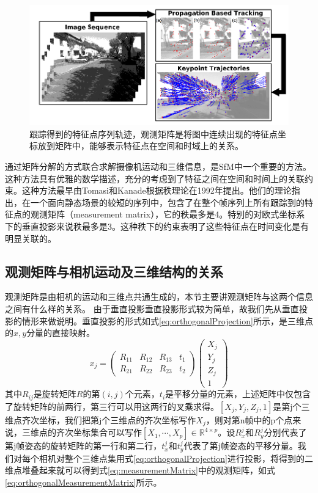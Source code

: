 \begin{figure}[htbp]
	\includegraphics[width=1\textwidth]{figs/1-3/feature_trajectory.png} 
	\caption{跟踪得到的特征点序列轨迹\cite{Fanani2016Keypoint}，观测矩阵是将图中连续出现的特征点坐标放到矩阵中，能够表示特征点在空间和时域上的关系。}
	\label{fig:feature_trajectory}
\end{figure}

通过矩阵分解的方式联合求解摄像机运动和三维信息，是SfM中一个重要的方法。这种方法具有优雅的数学描述，充分的考虑到了特征之间在空间和时间上的关联约束。这种方法最早由Tomasi和Kanade\cite{Tomasi1992Shape}根据秩理论在1992年提出。他们的理论指出，在一个面向静态场景的较短的序列中，包含了在整个帧序列上所有跟踪到的特征点的观测矩阵（measurement matrix），它的秩最多是4。特别的对欧式坐标系下的垂直投影来说秩最多是3\cite{Costeira1995A,Tomasi1992Shape,Irani2002Multi,Liu2011Subspace}。这种秩下的约束表明了这些特征点在时间变化是有明显关联的。
\subsection{观测矩阵与相机运动及三维结构的关系}\label{subsec:measurementMatrix}
观测矩阵是由相机的运动和三维点共通生成的，本节主要讲观测矩阵与这两个信息之间有什么样的关系。
由于垂直投影垂直投影形式较为简单，故我们先从垂直投影的情形来做说明\cite{Tomasi1992Shape}。垂直投影的形式如式\eqref{eq:orthogonalProjection}所示，是三维点的$x,y$分量的直接映射。
\begin{equation}\label{eq:orthogonalProjection}
x_j=
\begin{pmatrix}
R_{11} & R_{12} & R_{13} & t_1\\
R_{21} & R_{22} & R_{23} & t_2
\end{pmatrix}
\begin{pmatrix}
X_j\\Y_j\\Z_j\\1
\end{pmatrix}
\end{equation}
其中$R_{ij}$是旋转矩阵$R$的第$(i,j)$个元素，$t_i$是平移分量的元素，上述矩阵中仅包含了旋转矩阵的前两行，第三行可以用这两行的叉乘求得。$[X_j,Y_j,Z_j,1]$是第j个三维点齐次坐标，我们把第j个三维点的齐次坐标写作$X_j$，则对第n帧中的p个点来说，三维点的齐次坐标集合可以写作$[X_1,\cdots,X_p]\in \mathbb{R}^{4\times p}$。设$R_x^j$和$R_y^j$分别代表了第j帧姿态的旋转矩阵的第一行和第二行，$t_x^j$和$t_y^j$代表了第j帧姿态的平移分量。我们对每个相机对整个三维点集用式\eqref{eq:orthogonalProjection}进行投影，将得到的二维点堆叠起来就可以得到式\eqref{eq:measurementMatrix}中的观测矩阵，如式\eqref{eq:orthogonalMeasurementMatrix}所示。

